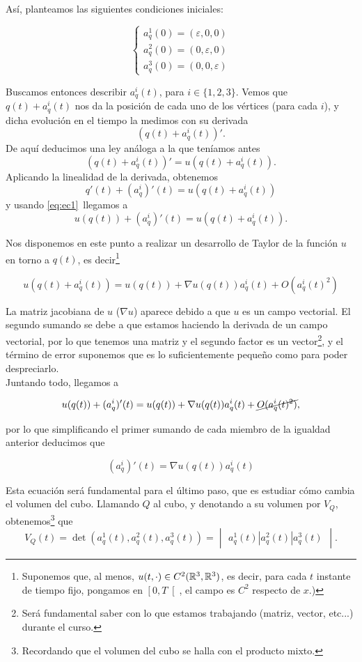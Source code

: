 \newpage

Así, planteamos las siguientes condiciones iniciales:

$$\begin{cases}
    a_q^1(0) = (\varepsilon, 0, 0) \\
    a_q^2(0) = (0, \varepsilon, 0) \\
    a_q^3(0) = (0, 0, \varepsilon)
\end{cases}$$

Buscamos entonces describir $a_q^i(t)$, para $i \in \{1,2,3\}$. Vemos que $q(t) + a_q^i(t)$ nos da la posición
de cada uno de los vértices (para cada $i$), y dicha evolución en el tiempo la medimos con su derivada
$$(q(t) + a_q^i(t))'.$$
De aquí deducimos una ley análoga a la que teníamos antes
$$(q(t) + a_q^i(t))' = u(q(t) + a_q^i(t)).$$
Aplicando la linealidad de la derivada, obtenemos
$$q'(t) + (a_q^i)'(t) = u(q(t) + a_q^i(t))$$
y usando \eqref{eq:ec1}~llegamos a 
$$u(q(t)) + (a_q^i)'(t) = u(q(t) + a_q^i(t)).$$

Nos disponemos en este punto a realizar un desarrollo de Taylor de la función $u$ en torno a $q(t)$, es decir\footnote{Suponemos que, al menos, $u(t, \cdot) \in C^2(\mathbb{R}^3, \mathbb{R}^3)$,
es decir, para cada $t$ instante de tiempo fijo, pongamos en $\left[0, T\right[$, el campo es $C^2$ respecto de $x$.)}

$$u(q(t) + a_q^i(t)) = u(q(t)) + \nabla u (q(t)) a_q^i(t) + O(a_q^i(t)^2)$$

La matriz jacobiana de $u$ ($\nabla u$) aparece debido a que $u$ es un campo vectorial. El segundo sumando se debe a que estamos haciendo la derivada de un campo vectorial, por lo que tenemos una matriz y 
el segundo factor es un vector\footnote{Será fundamental saber con lo que estamos trabajando (matriz, vector, etc...) 
durante el curso.}, y el término de error suponemos que es lo suficientemente pequeño como para poder 
despreciarlo. \\

Juntando todo, llegamos a

$$u(q(t)) + (a_q^i)'(t) = u(q(t)) + \nabla u (q(t)) a_q^i(t) + \cancel{O(a_q^i(t)^2)},$$

por lo que simplificando el primer sumando de cada miembro de la igualdad anterior deducimos que 

$$(a_q^i)'(t) = \nabla u (q(t)) a_q^i(t)$$

Esta ecuación será fundamental para el último paso, que es estudiar cómo cambia el volumen del cubo. Llamando $Q$ al cubo,
y denotando a su volumen por $V_Q$, obtenemos\footnote{Recordando que el volumen del cubo se halla con el producto mixto.} que
$$V_Q(t) = \det(a_q^1(t), a_q^2(t), a_q^3(t)) = \begin{vmatrix}
    a_q^1(t) | a_q^2(t) | a_q^3(t) 
\end{vmatrix}.$$

